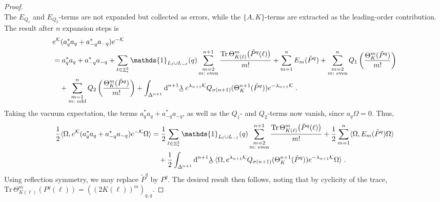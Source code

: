 \documentclass[12pt,a4paper]{article}
\numberwithin{equation}{section}
\newcommand{\cK}{\mathcal{K}}
\newcommand{\1}{\mathbb{I}}
\newcommand{\di}{\textnormal{d}}
\DeclareMathOperator{\Z}{\mathbb{Z}}
\newcommand{\half}{\frac{1}{2}}
\theoremstyle{plain}
\theoremstyle{definition}
\theoremstyle{remark}
\theoremstyle{plain}
\theoremstyle{definition}
\theoremstyle{remark}
\begin{document}
\begin{proof}
\begin{equation}
\end{equation}
The $ E_{Q_1} $ and $ E_{Q_2} $-terms are not expanded but collected as errors, while the $ \{A,K\} $-terms are extracted as the leading-order contribution. The result after $ n $ expansion steps is
\begin{equation}
\begin{aligned}
	&e^{\cK} (a_q^* a_q + a_{-q}^* a_{-q}) e^{-\cK} \\
	&= a_q^* a_q + a_{-q}^* a_{-q}
		+ \sum\limits_{\ell\in \Z^3_*} \mathds{1}_{L_\ell \cup L_{-\ell}}(q) \sum\limits_{\substack{m=2\\m:\textnormal{ even}}}^{n+1} \frac{\mathrm{Tr} \,\Theta^m_{K(\ell)} \big( \tilde{P}^q(\ell) \big)}{m!}
		+ \sum\limits_{m=1}^n E_m(\tilde{P}^q)
		+ \sum\limits_{\substack{m=2\\m:\textnormal{ even}}}^n
		Q_1\left( \frac{\Theta^m_{K}(\tilde{P}^q)}{m!}\right) \\
	&\quad+ \sum\limits_{\substack{m=1\\m:\textnormal{ odd}}}^n
		Q_2\left( \frac{\Theta^m_{K}(\tilde{P}^q)} {m!}\right)
		+\int_{\Delta^{n+1}} \di^{n+1}\underline{\lambda} \;
		e^{\lambda_{n+1} \cK}Q_{\sigma(n+1)}(\Theta^{n+1}_{K}(\tilde{P}^q)) e^{-\lambda_{n+1} \cK} \;.
\end{aligned}
\end{equation}
Taking the vacuum expectation, the terms $ a_q^* a_q + a_{-q}^* a_{-q} $, as well as the $ Q_1 $- and $ Q_2 $-terms now vanish, since $ a_q \Omega = 0 $. Thus,
\begin{equation}
\begin{aligned}
	\half \langle \Omega, e^{\cK} (a_q^* a_q + a_{-q}^* a_{-q}) e^{-\cK} \Omega \rangle
	&= \half \sum\limits_{\ell\in \Z^3_*} \mathds{1}_{L_\ell \cup L_{-\ell}}(q) \sum\limits_{\substack{m=2\\m:\textnormal{ even}}}^{n+1} \frac{\mathrm{Tr} \,\Theta^m_{K(\ell)} \big( \tilde{P}^q(\ell) \big)}{m!}
		+ \half \sum\limits_{m=1}^n \langle \Omega, E_m(\tilde{P}^q) \Omega \rangle \\
	&\quad +\half \int_{\Delta^{n+1}} \di^{n+1}\underline{\lambda} \;
		\langle \Omega, e^{\lambda_{n+1} \cK}Q_{\sigma(n+1)}(\Theta^{n+1}_{K}(\tilde{P}^q)) e^{-\lambda_{n+1} \cK} \Omega \rangle \;.
\end{aligned}
\end{equation}
Using reflection symmetry, we may replace $ \tilde{P}^q $ by $ P^q $. The desired result then follows, noting that by cyclicity of the trace, $ \mathrm{Tr} \,\Theta^m_{K(\ell)} (P^q(\ell)) = ((2K(\ell))^m)_{q,q} $.
\end{proof}
\end{document}
